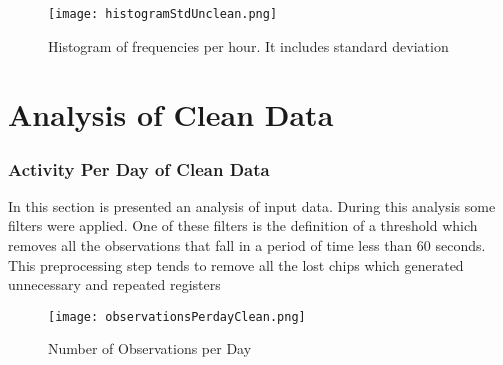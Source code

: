 \documentclass[11pt,fleqn]{book} %
\begin{document}
%


\begin{figure}[h!]%
\centering%
\texttt{[image: histogramStdUnclean.png]}%
\caption{Histogram of frequencies per hour. It includes standard deviation}%
\end{figure}

\chapter{Analysis of Clean Data}
\normalsize%
\subsection{Activity Per Day of Clean Data}%
\label{subsec:Activity Per Day of Clean Data}%
In this section is presented an analysis of input data. During this analysis some filters were applied. One of these filters is the definition of a threshold which removes all the observations that fall in a period of time less than 60 seconds. This preprocessing step tends to  remove all the lost chips which generated unnecessary and repeated registers %


\begin{figure}[h!]%
\centering%
\texttt{[image: observationsPerdayClean.png]}%
\caption{Number of Observations per Day}%
\end{figure}
\end{document}
